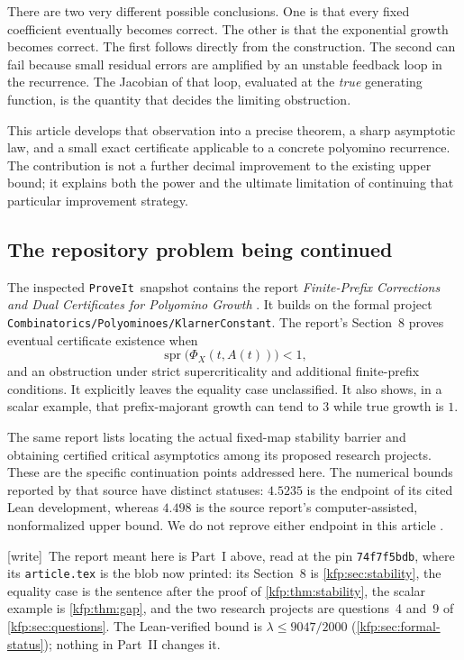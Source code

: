 \documentclass[11pt,a4paper]{article}
\theoremstyle{definition}
\theoremstyle{remark}
\newcommand{\spr}{\operatorname{spr}}
\newcommand{\repo}{\texttt{ProveIt}}
\newcommand{\wtag}{\textsf{\small[write]}}
\begin{document}
There are two very different possible conclusions. One is that every
fixed coefficient eventually becomes correct. The other is that the
exponential growth becomes correct. The first follows directly from the
construction. The second can fail because small residual errors are
amplified by an unstable feedback loop in the recurrence. The Jacobian of
that loop, evaluated at the \emph{true} generating function, is the
quantity that decides the limiting obstruction.

This article develops that observation into a precise theorem, a sharp
asymptotic law, and a small exact certificate applicable to a concrete
polyomino recurrence. The contribution is not a further decimal improvement
to the existing upper bound; it explains both the power and the ultimate
limitation of continuing that particular improvement strategy.

\subsection{The repository problem being continued}
The inspected \repo\ snapshot contains the report \emph{Finite-Prefix
Corrections and Dual Certificates for Polyomino Growth} \cite{satprefix}.
It builds on the formal project
\texttt{Combinatorics/Polyominoes/}\allowbreak\texttt{KlarnerConstant}. The report's Section~8
proves eventual certificate existence when
\[
 \spr\bigl(\Phi_X(t,A(t))\bigr)<1,
\]
and an obstruction under strict supercriticality and additional finite-prefix
conditions. It explicitly leaves the equality case unclassified. It also
shows, in a scalar example, that prefix-majorant growth can tend to $3$
while true growth is $1$.

The same report lists locating the actual fixed-map stability barrier and
obtaining certified critical asymptotics among its proposed research
projects. These are the specific continuation points addressed here.
The numerical bounds reported by that source have distinct statuses:
$4.5235$ is the endpoint of its cited Lean development, whereas $4.498$ is
the source report's computer-assisted, nonformalized upper bound. We do not
reprove either endpoint in this article \cite{satprefix,satformal}.

\wtag\ The report meant here is Part~I above, read at the pin
\texttt{74f7f5bdb}, where its \texttt{article.tex} is the blob now printed:
its Section~8 is \cref{kfp:sec:stability}, the equality case is the sentence
after the proof of \cref{kfp:thm:stability}, the scalar example is
\cref{kfp:thm:gap}, and the two research projects are questions~4 and~9 of
\cref{kfp:sec:questions}. The Lean-verified bound is $\lambda\le9047/2000$
(\cref{kfp:sec:formal-status}); nothing in Part~II changes it.
\end{document}
